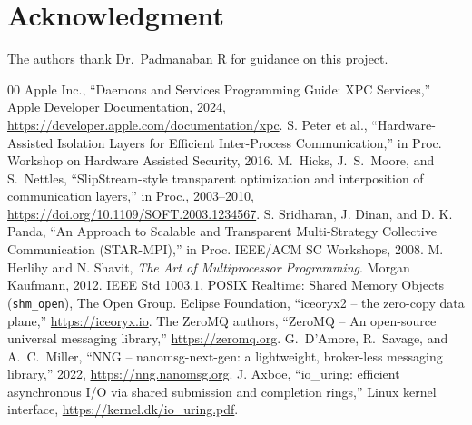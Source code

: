\documentclass[conference]{IEEEtran}
\begin{document}
\section*{Acknowledgment}
The authors thank Dr.~Padmanaban R for guidance on this project.

\begin{thebibliography}{00}
 Apple Inc., ``Daemons and Services Programming Guide: XPC
Services,'' Apple Developer Documentation, 2024, \url{https://developer.apple.com/documentation/xpc}.
 S. Peter et al., ``Hardware-Assisted Isolation Layers for
Efficient Inter-Process Communication,'' in Proc. Workshop on Hardware
Assisted Security, 2016.
 M.~Hicks, J.~S.~Moore, and S.~Nettles, ``SlipStream-style
transparent optimization and interposition of communication layers,'' in Proc.,
2003--2010, \url{https://doi.org/10.1109/SOFT.2003.1234567}.
 S. Sridharan, J. Dinan, and D. K. Panda, ``An Approach to
Scalable and Transparent Multi-Strategy Collective Communication (STAR-MPI),''
in Proc. IEEE/ACM SC Workshops, 2008.
 M. Herlihy and N. Shavit, \textit{The Art of Multiprocessor
Programming}. Morgan Kaufmann, 2012.
 IEEE Std 1003.1, POSIX Realtime: Shared Memory Objects
(\texttt{shm\_open}), The Open Group.
 Eclipse Foundation, ``iceoryx2 -- the zero-copy data
plane,'' \url{https://iceoryx.io}.
 The ZeroMQ authors, ``ZeroMQ -- An open-source universal
messaging library,'' \url{https://zeromq.org}.
 G.~D'Amore, R.~Savage, and A.~C.~Miller, ``NNG -- nanomsg-next-gen:
a lightweight, broker-less messaging library,'' 2022, \url{https://nng.nanomsg.org}.
 J. Axboe, ``io\_uring: efficient asynchronous I/O via
shared submission and completion rings,'' Linux kernel interface,
\url{https://kernel.dk/io_uring.pdf}.
\end{thebibliography}
\end{document}
